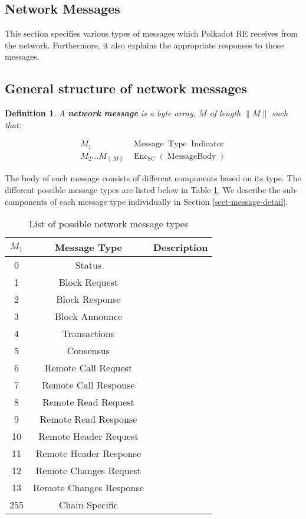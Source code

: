 \documentclass{article}
\newcommand{\tmop}[1]{\ensuremath{\operatorname{#1}}}
\newcommand{\tmstrong}[1]{\textbf{#1}}
\newcommand{\tmtextbf}[1]{{\bfseries{#1}}}
\newtheorem{definition}{Definition}
\providecommand{\tmop}[1]{\ensuremath{\mathrm{#1}}}
\providecommand{\tmstrong}[1]{\tmtextbf{#1}}
\providecommand{\tmtextbf}[1]{\tmtextbf{#1}}
\newtheorem{definition}{Definition}
\begin{document}
\subsection{Network Messages}

This section specifies various types of messages which Polkadot RE receives
from the network. Furthermore, it also explains the appropriate responses to
those messages.

\subsection{General structure of network messages}

\begin{definition}
  A {\tmstrong{network message}} is a byte array, {\tmstrong{$M$}} of length
  $\| M \|$ such that:
  
  
  \[ \begin{array}{cc}
       M_1 & \tmop{Message} \tmop{Type} \tmop{Indicator}\\
       M_2 \ldots M_{\| M \|} & \tmop{Enc}_{\tmop{SC}} (\tmop{MessageBody})
     \end{array} \]
  
\end{definition}

The body of each message consists of different components based on its type.
The different possible message types are listed below in Table
\ref{tabl-message-types}. We describe the sub-components of each message type
individually in Section \ref{sect-message-detail}.

\begin{table}[h]
  \begin{tabular}{|c|c|c|}
    \hline
    $M_1$ & Message Type & Description\\
    \hline
    0 & Status & \\
    1 & Block Request & \\
    2 & Block Response & \\
    3 & Block Announce & \\
    4 & Transactions & \\
    5 & Consensus & \\
    6 & Remote Call Request & \\
    7 & Remote Call Response & \\
    8 & Remote Read Request & \\
    9 & Remote Read Response & \\
    10 & Remote Header Request & \\
    11 & Remote Header Response & \\
    12 & Remote Changes Request & \\
    13 & Remote Changes Response & \\
    255 & Chain Specific & \\
    \hline
  \end{tabular}
  \caption{\label{tabl-message-types}List of possible network message types}
\end{table}
\end{document}
